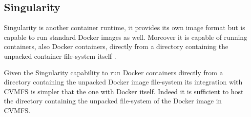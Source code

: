 \subsection{Singularity}

Singularity \citep{singularity:home} is another container runtime, it provides
its own image format but is capable to run standard Docker images
\cite{singularity:docker} as well.  Moreover it is capable of running containers,
also Docker containers, directly from a directory containing the unpacked
container file-system itself \cite{singularity:run}. 

Given the Singularity capability to run Docker containers directly from a
directory containing the unpacked Docker image file-system its integration with
CVMFS is simpler that the one with Docker itself. Indeed it is sufficient to host
the directory containing the unpacked file-system of the Docker image in CVMFS.


